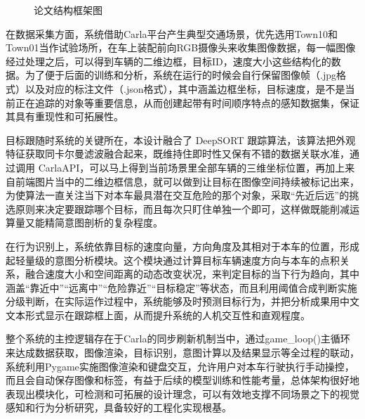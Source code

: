 \begin{figure}[H]
	\centering
	\caption{论文结构框架图}
	\label{fig:example_image}
\end{figure}

在数据采集方面，系统借助Carla平台产生典型交通场景，优先选用Town10和Town01当作试验场所，在车上装配前向RGB摄像头来收集图像数据，每一幅图像经过处理之后，可以得到车辆的二维边框，目标ID，速度大小这些结构化的数据。为了便于后面的训练和分析，系统在运行的时候会自行保留图像帧（.jpg格式）以及对应的标注文件（.json格式），其中涵盖边框坐标，目标速度，是不是当前正在追踪的对象等重要信息，从而创建起带有时间顺序特点的感知数据集，保证其具有重现性和可拓展性。

目标跟随时系统的关键所在，本设计融合了 DeepSORT 跟踪算法，该算法把外观特征获取同卡尔曼滤波融合起来，既维持住即时性又保有不错的数据关联水准，通过调用 CarlaAPI，可以马上得到当前场景里全部车辆的三维坐标位置，再加上来自前端图片当中的二维边框信息，就可以做到让目标在图像空间持续被标记出来，为使算法一直关注当下对本车最具潜在交互危险的那个对象，采取“先近后远”的挑选原则来决定要跟踪哪个目标，而且每次只盯住单独一个即可，这样做既能削减运算量又能精简意图剖析的复杂程度。

在行为识别上，系统依靠目标的速度向量，方向角度及其相对于本车的位置，形成起轻量级的意图分析模块。这个模块通过计算目标车辆速度方向与本车的点积关系，融合速度大小和空间距离的动态改变状况，来判定目标的当下行为趋向，其中涵盖“靠近中”“远离中”“危险靠近”“目标稳定”等状态，而且利用阈值合成判断实施分级判断，在实际运作过程中，系统能够及时预测目标行为，并把分析成果用中文文本形式显示在跟踪框上面，从而提升系统的人机交互性和直观程度。

整个系统的主控逻辑存在于Carla的同步刷新机制当中，通过game\_loop()主循环来达成数据获取，图像渲染，目标识别，意图计算以及结果显示等全过程的联动，系统利用Pygame实施图像渲染和键盘交互，允许用户对本车行驶执行手动操控，而且会自动保存图像和标签，有益于后续的模型训练和性能考量，总体架构很好地表现出模块化，可检测和可拓展的设计理念，可以有效地支撑不同场景之下的视觉感知和行为分析研究，具备较好的工程化实现根基。




\begin{tabular}{l l}
\end{tabular}
